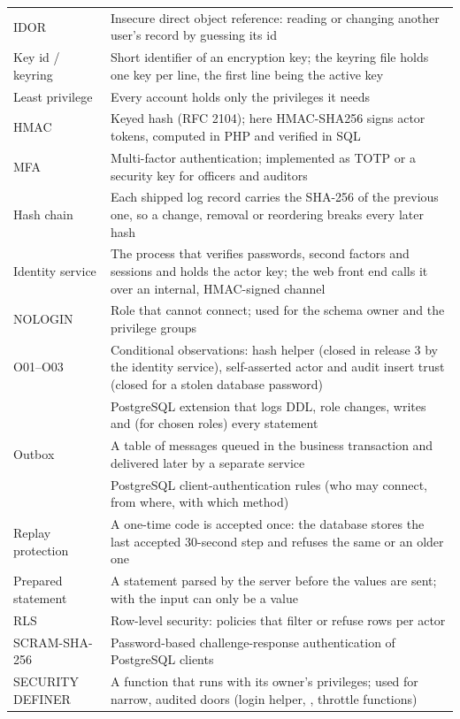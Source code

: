 \begin{center}
\begin{longtable}{@{}L{3.2cm}L{12.6cm}@{}}
IDOR & Insecure direct object reference: reading or changing another user's record by guessing its id\\
Key id / keyring & Short identifier of an encryption key; the keyring file holds one key per line, the first line being the active key\\
Least privilege & Every account holds only the privileges it needs\\
HMAC & Keyed hash (RFC 2104); here HMAC-SHA256 signs actor tokens, computed in PHP and verified in SQL\\
MFA & Multi-factor authentication; implemented as TOTP or a security key for officers and auditors\\
Hash chain & Each shipped log record carries the SHA-256 of the previous one, so a change, removal or reordering breaks every later hash\\
Identity service & The process that verifies passwords, second factors and sessions and holds the actor key; the web front end calls it over an internal, HMAC-signed channel\\
NOLOGIN & Role that cannot connect; used for the schema owner and the privilege groups\\
O01--O03 & Conditional observations: hash helper (closed in release 3 by the identity service), self-asserted actor and audit insert trust (closed for a stolen database password)\\
 & PostgreSQL extension that logs DDL, role changes, writes and (for chosen roles) every statement\\
Outbox & A table of messages queued in the business transaction and delivered later by a separate service\\
 & PostgreSQL client-authentication rules (who may connect, from where, with which method)\\
Replay protection & A one-time code is accepted once: the database stores the last accepted 30-second step and refuses the same or an older one\\
Prepared statement & A statement parsed by the server before the values are sent; with  the input can only be a value\\
RLS & Row-level security: policies that filter or refuse rows per actor\\
SCRAM-SHA-256 & Password-based challenge-response authentication of PostgreSQL clients\\
SECURITY DEFINER & A function that runs with its owner's privileges; used for narrow, audited doors (login helper, , throttle functions)\\

\end{longtable}
\end{center}
